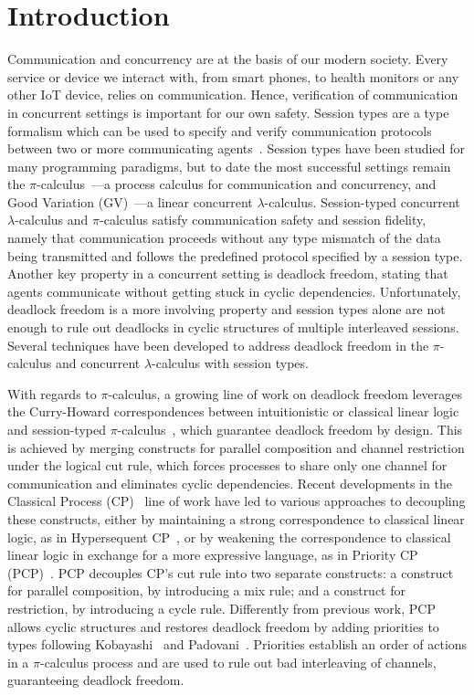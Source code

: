 \documentclass[main.tex]{subfiles}
\begin{document}
\section{Introduction}
Communication and concurrency are at the basis of our modern society. Every service or device we interact with, from smart phones, to health monitors or any other IoT device, relies on communication. Hence, verification of communication in concurrent settings is important for our own safety. Session types are a type formalism which can be used to specify and verify communication protocols between two or more communicating agents~\cite{honda93,takeuchihonda94,hondavasconcelos98,carbonehonda07}.
Session types have been studied for many programming paradigms, but to date the most successful settings remain the $\pi$-calculus~\cite{sangiorgiwalker01}---a process calculus for communication and concurrency, and Good Variation (GV)~\cite{wadler15,lindleymorris15}---a linear concurrent $\lambda$-calculus.
Session-typed concurrent $\lambda$-calculus and $\pi$-calculus satisfy communication safety and session fidelity, namely that communication proceeds without any type mismatch of the data being transmitted and follows the predefined protocol specified by a session type.
Another key property in a concurrent setting is deadlock freedom, stating that agents communicate without getting stuck in cyclic dependencies. Unfortunately, deadlock freedom is a more involving property and session types alone are not enough to rule out deadlocks in cyclic structures of multiple interleaved sessions. Several techniques have been developed to address deadlock freedom in the $\pi$-calculus and concurrent $\lambda$-calculus with session types.

With regards to $\pi$-calculus, a growing line of work on deadlock freedom leverages the Curry-Howard correspondences between intuitionistic or classical linear logic and session-typed $\pi$-calculus~\cite{cairespfenning10,wadler12}, which guarantee deadlock freedom by design. This is achieved by merging constructs for parallel composition and channel restriction under the logical cut rule, which forces processes to share only one channel for communication and eliminates cyclic dependencies. Recent developments in the Classical Process (CP)~\cite{wadler12} line of work have led to various approaches to decoupling these constructs, either by maintaining a strong correspondence to classical linear logic, as in Hypersequent CP~\cite{kokkemontesi19popl,kokkemontesi19tlla}, or by weakening the correspondence to classical linear logic in exchange for a more expressive language, as in Priority CP (PCP)~\cite{dardhagay18}. PCP decouples CP's cut rule into two separate constructs: a construct for parallel composition, by introducing a mix rule; and a construct for restriction, by introducing a cycle rule. Differently from previous work, PCP allows cyclic structures and restores deadlock freedom by adding priorities to types following Kobayashi~\cite{kobayashi06} and Padovani~\cite{padovani14}. Priorities establish an order of actions in a $\pi$-calculus process and are used to rule out bad interleaving of channels, guaranteeing deadlock freedom.
\end{document}

